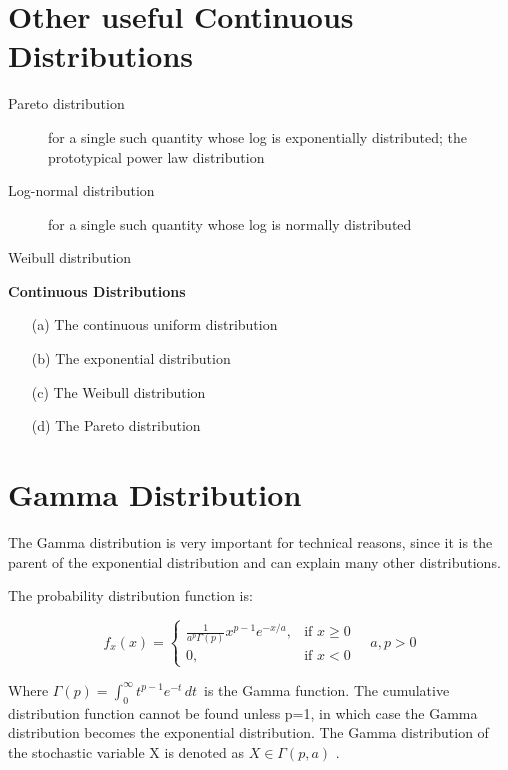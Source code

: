 \documentclass[]{report}
\begin{document}
\section{Other useful Continuous Distributions}
\begin{description}
\item [Pareto distribution] for a single such quantity whose log is exponentially distributed; 
the prototypical power law distribution
\item [Log-normal distribution] for a single such quantity whose log is normally distributed
\item [Weibull distribution]
\end{description}




\noindent \textbf{ Continuous Distributions}
\begin{multicols}{2}
\begin{itemize}
\item[(a)] The continuous uniform distribution
\item[(b)] The exponential distribution
\item[(c)] The Weibull distribution
\item[(d)] The Pareto distribution
\end{itemize}
\end{multicols}



\section{Gamma Distribution}




The Gamma distribution is very important for technical reasons, since it is the parent of the exponential distribution and can explain many other distributions.

The probability distribution function is:

$$
f_x (x) =
\begin{cases}
\frac{1}{a^p \Gamma (p)} x^{p-1} e^{-x/a}, & \mbox{if } x \ge 0 \\
0, & \mbox{if } x < 0
\end{cases}\quad a,p >0$$

Where  $\Gamma(p) = \int_0^\infty  t^{p-1} e^{-t}\,dt\,$ is the Gamma function. The cumulative distribution function cannot be found unless p=1, in which case the Gamma distribution becomes the exponential distribution. The Gamma distribution of the stochastic variable X is denoted as  $X \in \Gamma (p,a)$ .
\end{document}
